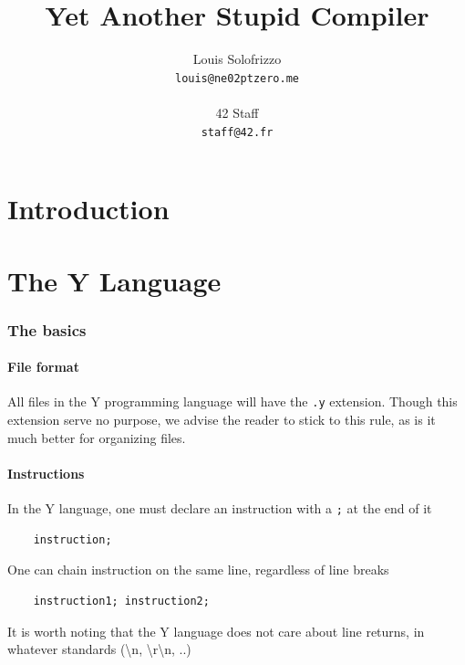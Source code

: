 \documentclass{scrartcl}
\title{Yet Another Stupid Compiler}
\author{
    Louis Solofrizzo\\
    \texttt{louis@ne02ptzero.me}\\
    \\
    42 Staff\\
    \texttt{staff@42.fr}
}
\begin{document}
\begin{titlingpage}
    \maketitle
\end{titlingpage}


    \tableofcontents{}
    \newpage

\part{Introduction}
\part{The Y Language}
    \section{The basics}
        \subsection{File format}
            All files in the Y programming language will have the \texttt{.y}
            extension. Though this extension serve no purpose, we advise the
            reader to stick to this rule, as is it much better for organizing files.
        \subsection{Instructions}
            In the Y language, one must declare an instruction with a \texttt{;}
            at the end of it
            \begin{lstlisting}
    instruction;
            \end{lstlisting}
            One can chain instruction on the same line, regardless of line breaks
            \begin{lstlisting}
    instruction1; instruction2;
            \end{lstlisting}
            It is worth noting that the Y language does not care about line returns,
            in whatever standards (\textbackslash n, \textbackslash r\textbackslash n, ..)
\end{document}
